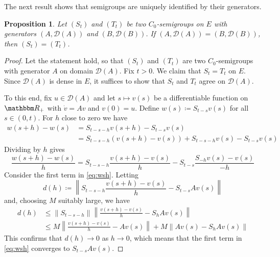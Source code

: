 \documentclass[12pt, reqno]{amsart}
\renewcommand{\leq}{\leqslant}
\newcommand{\1}{\mathbbm 1}
\newcommand{\dD}{\mathcal D}
\newcommand{\RR}{\mathbbm R}
\theoremstyle{plain}
\newtheorem{proposition}[theorem]{Proposition}
\theoremstyle{definition}
\begin{document}
The next result shows that semigroups are uniquely identified by their
generators.

\begin{proposition}\label{p:sgufg}
    Let $(S_t)$ and $(T_t)$ be two $C_0$-semigroups on $E$ with 
    generators $(A, \dD(A))$ and $(B, \dD(B))$.  If $(A, \dD(A)) = (B, \dD(B))$,
    then $(S_t) = (T_t)$.
\end{proposition}

\begin{proof}
    Let the statement hold, so that $(S_t)$ and $(T_t)$ are two $C_0$-semigroups
    with generator $A$ on domain $\dD(A)$. Fix $t > 0$.  We claim
    that $S_t = T_t$ on $E$. Since $\dD(A)$ is dense in $E$, it suffices to show
    that $S_t$ and $T_t$ agree on
    $\dD(A)$.

    To this end, fix $u \in \dD(A)$ and let $s \mapsto v(s)$ be a differentiable
    function on $\RR_+$ with $\dot v = A v$ and $v(0) = u$.  Define $w(s)
    \coloneq S_{t-s} v(s)$ for all $s \in (0, t)$.
    For $h$ close to zero we have 
    \begin{align*}
        w(s + h) - w(s)
        & = S_{t-s-h} v(s + h) - S_{t-s} v(s)
        \\
        & = S_{t-s-h} (v(s + h) - v(s)) + S_{t-s-h} v(s) - S_{t-s} v(s)
    \end{align*}
    Dividing by $h$ gives
    \begin{equation}\label{eq:wsh}
        \frac{w(s + h) - w(s)}{h}
        = S_{t-s-h} \frac{v(s + h) - v(s)}{h} 
            - S_{t-s} \frac{S_{-h} v(s) - v(s)}{-h}
    \end{equation}
    Consider the first term in \eqref{eq:wsh}.  Letting
    \begin{equation*}
        d(h) \coloneq
        \left\|
           S_{t-s-h} \frac{v(s + h) - v(s)}{h} 
           - S_{t-s} A v(s)
        \right\|
    \end{equation*}
    and, choosing $M$ suitably large, we have
    \begin{align*}
        d(h) 
        & \leq 
        \|S_{t-s-h}\|
        \left\|
            \frac{v(s + h) - v(s)}{h} 
           - S_h A v(s)
        \right\|
        \\
        & \leq M
        \left\|
            \frac{v(s + h) - v(s)}{h} 
           - A v(s)
        \right\|
        + M \| Av(s) - S_h A v(s) \|
    \end{align*}
    This confirms that $d(h) \to 0$ as $h \to 0$, which means that the first
    term in \eqref{eq:wsh} converges to $S_{t-s} A v(s)$.


\end{proof}
\end{document}
